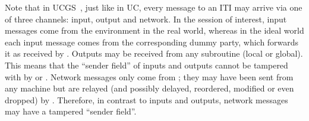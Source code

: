 Note that in UCGS~\cite{DBLP:conf/tcc/BadertscherCHTZ20}, just like in UC, every
message to an ITI may arrive via one of three channels: input, output and
network. In the session of interest, input messages come from the environment
\environment in the real world, whereas in the ideal world each input message
comes from the corresponding dummy party, which forwards it as received by
\environment. Outputs may be received from any subroutine (local or global).
This means that the ``sender field'' of inputs and outputs cannot be tampered
with by \environment or \adversary. Network messages only come from \adversary;
they may have been sent from any machine but are relayed (and possibly delayed,
reordered, modified or even dropped) by \adversary. Therefore, in contrast to
inputs and outputs, network messages may have a tampered ``sender field''.

